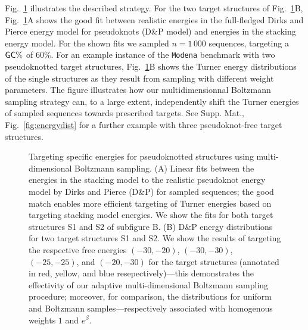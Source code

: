 \documentclass{bioinfo}
\makeatletter
\newlength{\@aligneps}
\newcommand{\includegraphicstop}[2][]{%
\sbox{\@alignepsbox}{\texttt{[image: \#2]}}%
\setlength{\@aligneps}{-\ht\@alignepsbox}%
\addtolength{\@aligneps}{2ex}%
\raisebox{\@aligneps}{\usebox{\@alignepsbox}}}
\makeatother
\begin{document}
Fig.~\ref{fig:energydist-pk} illustrates the described strategy. For
the two target structures of Fig.~\ref{fig:energydist-pk}B,
Fig.~\ref{fig:energydist-pk}A shows the good fit between realistic
energies in the full-fledged Dirks and Pierce energy model for
pseudoknots (D\&P model) and energies in the stacking energy
model. For the shown fits we sampled $n=1\,000$ sequences, targeting a
${\sf GC}\%$ of $60\%$.
%
For an example instance of the \texttt{Modena} benchmark with two
pseudoknotted target structures, Fig.~\ref{fig:energydist-pk}B shows
the Turner energy distributions of the single structures as they
result from sampling with different weight parameters. The figure
illustrates how our multidimensionnal Boltzmann sampling strategy can,
to a large extent, independently shift the Turner energies of sampled
sequences towards prescribed targets. See Supp. Mat.,
Fig.~\ref{fig:energydist} for a further example with three
pseudoknot-free target structures.

\begin{figure}[t]
  \begin{center}
    \includegraphicstop[width=0.99\textwidth]{Figs/energy_shift.pdf}\hfill
  \end{center}
  \caption{%
    Targeting specific energies for pseudoknotted structures using
    multi-dimensional Boltzmann sampling.  (A) Linear fits between the
    energies in the stacking model to the realistic pseudoknot energy
    model by Dirks and Pierce (D\&P) for sampled sequences; the good
    match enables more efficient targeting of Turner energies based on
    targeting stacking model energies.  We show the fits for both
    target structures S1 and S2 of subfigure B.  (B) D\&P energy
    distributions for two target structures S1 and S2. We show the
    results of targeting the respective free energies $(-30,-20)$,
    $(-30,-30)$, $(-25,-25)$, and $(-20,-30)$ for the target
    structures (annotated in red, yellow, and blue
    resepectively)---this demonstrates the effectivity of our adaptive
    multi-dimensional Boltzmann sampling procedure; moreover, for
    comparison, the distributions for uniform and Boltzmann
    samples---respectively associated with homogenous weights $1$ and
    $e^\beta$.
  }
  \label{fig:energydist-pk}
\end{figure}
\end{document}

